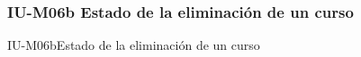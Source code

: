 
\subsubsection{IU-M06b Estado de la eliminación de un curso}


        {IU-M06b}{Estado de la eliminación de un curso}

\begin{comment}
\subsubsection{Elementos Relevantes}

    \begin{itemize}
    \item {\bf Lorem ipsum}
        ...
    \end{itemize}

\subsubsection{Acciones relevantes}

    \begin{itemize}
    \item {\bf Lorem ipsum}
        ...
    \end{itemize}
\end{comment}

\clearpage
